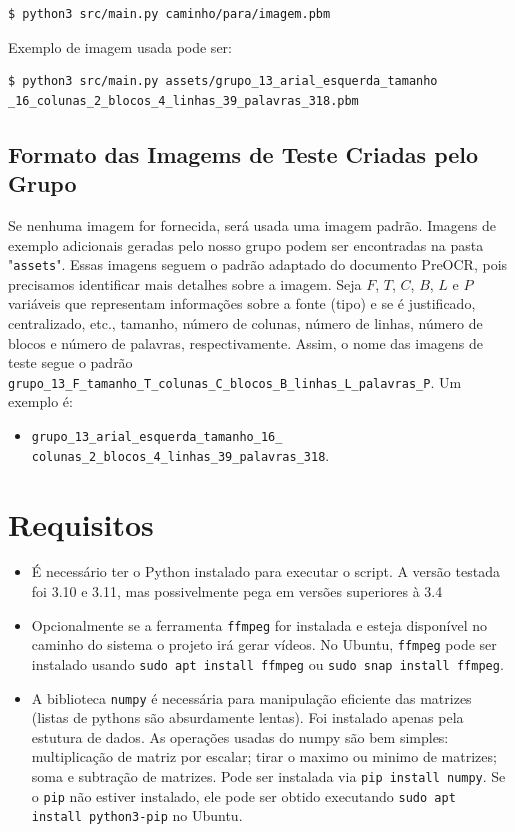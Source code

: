 \documentclass[english, 
               brazil, 
               bsc] %
               {dcomp-abntex2}
\begin{document}
\begin{verbatim}
$ python3 src/main.py caminho/para/imagem.pbm
\end{verbatim}

Exemplo de imagem usada pode ser:
\begin{verbatim}
$ python3 src/main.py assets/grupo_13_arial_esquerda_tamanho
_16_colunas_2_blocos_4_linhas_39_palavras_318.pbm
\end{verbatim}

\subsection{Formato das Imagems de Teste Criadas pelo Grupo}
Se nenhuma imagem for fornecida, será usada uma imagem padrão. Imagens de exemplo adicionais geradas pelo nosso grupo podem ser encontradas na pasta "\texttt{assets}". Essas imagens seguem o padrão adaptado do documento PreOCR, pois precisamos identificar mais detalhes sobre a imagem. Seja $F$, $T$, $C$, $B$, $L$ e $P$ variáveis que representam informações sobre a fonte (tipo) e se é justificado, centralizado, etc., tamanho, número de colunas, número de linhas, número de blocos e número de palavras, respectivamente. Assim, o nome das imagens de teste segue o padrão \texttt{grupo\_13\_F\_tamanho\_T\_colunas\_C\_blocos\_B\_linhas\_L\_palavras\_P}. Um exemplo é:

\begin{itemize}
  \item \texttt{\small grupo\_13\_arial\_esquerda\_tamanho\_16\_
    colunas\_2\_blocos\_4\_linhas\_39\_palavras\_318}.
\end{itemize}

\section{Requisitos} \label{sec-req}
\begin{itemize}
  \item É necessário ter o Python instalado para executar o script. A versão testada foi 3.10 e 3.11, mas possivelmente pega em versões superiores à 3.4
  \item Opcionalmente se a ferramenta \texttt{ffmpeg} for instalada e esteja disponível no caminho do sistema o projeto irá gerar vídeos. No Ubuntu, \texttt{ffmpeg} pode ser instalado usando \texttt{sudo apt install ffmpeg} ou \texttt{sudo snap install ffmpeg}.
  \item A biblioteca \texttt{numpy} é necessária para manipulação eficiente das matrizes (listas de pythons são absurdamente lentas). Foi instalado apenas pela estutura de dados. As operações usadas do numpy são bem simples:  multiplicação de matriz por escalar; tirar o maximo ou minimo de matrizes; soma e subtração de matrizes. Pode ser instalada via \texttt{pip install numpy}. Se o \texttt{pip} não estiver instalado, ele pode ser obtido executando \texttt{sudo apt install python3-pip} no Ubuntu. \end{itemize}
\end{document}
